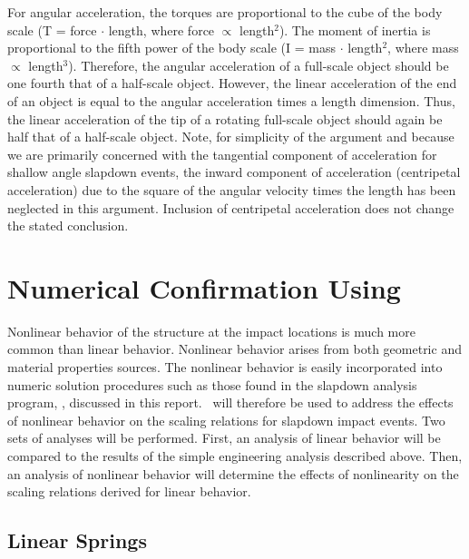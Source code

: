      For angular acceleration, the torques are proportional to the
cube of the body scale
(T = force $\cdot$ length, where force $\propto$ length$^{2}$).
The moment of inertia is
proportional to the fifth power of the body scale
(I = mass $\cdot$ length$^{2}$, where mass $\propto$ length$^{3}$).
Therefore, the angular acceleration of a full-scale object
should be one fourth that of a half-scale object.  However, the linear
acceleration of the end of an object is equal to the angular
acceleration times a length dimension.  Thus, the linear acceleration
of the tip of a rotating full-scale object should again be half that
of a half-scale object.  Note, for simplicity of the argument and
because we are primarily concerned with the tangential component of
acceleration for shallow angle slapdown events, the inward component
of acceleration (centripetal acceleration) due to the square of the
angular velocity times the length has been neglected in this argument.
Inclusion of centripetal acceleration does not change the stated
conclusion.

\section{Numerical Confirmation Using \SLAP}

     Nonlinear behavior of the structure at the impact locations is
much more common than linear behavior.  Nonlinear behavior arises from
both geometric and material properties sources.  The nonlinear
behavior is easily incorporated into numeric solution procedures such
as those found in the slapdown analysis program, \SLAP , discussed in
this report.  \SLAP\ will therefore be used to address the effects
of nonlinear behavior on the scaling relations for slapdown impact
events.  Two sets of analyses will be performed.  First, an analysis
of linear behavior will be compared to the results of the simple
engineering analysis described above.  Then, an analysis of nonlinear
behavior will determine the effects of nonlinearity on the scaling
relations derived for linear behavior.

\subsection{Linear Springs}

